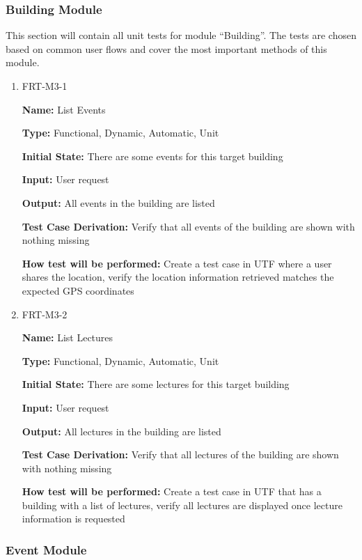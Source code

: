 \documentclass[12pt, titlepage]{article}
\begin{document}
\subsubsection{Building Module}

This section will contain all unit tests for module ``Building''. The tests are chosen based on common user flows and cover the most important methods of this module.

\begin{enumerate}
\item{FRT-M3-1}

\textbf{Name:} List Events

\textbf{Type:} Functional, Dynamic, Automatic, Unit
					
\textbf{Initial State:} There are some events for this target building
					
\textbf{Input:} User request
					
\textbf{Output:} All events in the building are listed

\textbf{Test Case Derivation:} Verify that all events of the building are shown with nothing missing

\textbf{How test will be performed:} Create a test case in UTF where a user shares the location, verify the location information retrieved matches the expected GPS coordinates

\item{FRT-M3-2}

\textbf{Name:} List Lectures

\textbf{Type:} Functional, Dynamic, Automatic, Unit
					
\textbf{Initial State:} There are some lectures for this target building
					
\textbf{Input:} User request
					
\textbf{Output:} All lectures in the building are listed

\textbf{Test Case Derivation:} Verify that all lectures of the building are shown with nothing missing

\textbf{How test will be performed:} Create a test case in UTF that has a building with a list of lectures, verify all lectures are displayed once lecture information is requested
\end{enumerate}

\subsubsection{Event Module}
\end{document}
